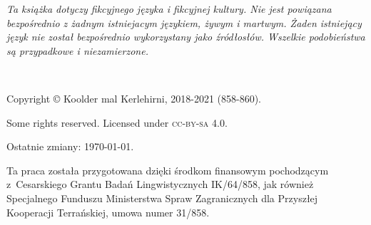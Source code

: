 \emph{Ta książka dotyczy fikcyjnego języka i fikcyjnej kultury. Nie jest
powiązana bezpośrednio z żadnym istniejacym językiem, żywym i martwym. Żaden
istniejący język nie został bezpośrednio wykorzystany jako źródłosłów. Wszelkie
podobieństwa są przypadkowe i niezamierzone.}

~\vfill

\begingroup
\setlength\parindent{0pt}\footnotesize
Copyright © Koolder mal Kerlehirni, 2018-2021 (858-860).

\bigskip

Some rights reserved. Licensed under \textsc{cc-by-sa} 4.0.

Ostatnie zmiany: \today{}.

\medskip

Ta praca została przygotowana dzięki środkom finansowym
pochodzącym z~Cesarskiego Grantu Badań Lingwistycznych IK/64/858,
jak również Specjalnego Funduszu Ministerstwa Spraw Zagranicznych dla
Przyszłej Kooperacji Terrańskiej, umowa numer 31/858.

\endgroup